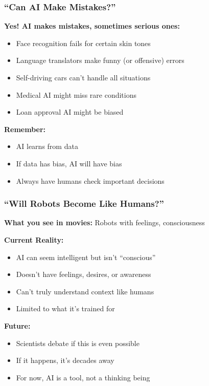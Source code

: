 \begin{frame}[fragile]\frametitle{``Can AI Make Mistakes?''}

{\bf Yes! AI makes mistakes, sometimes serious ones:}

\begin{itemize}
\item Face recognition fails for certain skin tones
\item Language translators make funny (or offensive) errors
\item Self-driving cars can't handle all situations
\item Medical AI might miss rare conditions
\item Loan approval AI might be biased
\end{itemize}

{\bf Remember:}
\begin{itemize}
\item AI learns from data
\item If data has bias, AI will have bias
\item Always have humans check important decisions
\end{itemize}
\end{frame}

\begin{frame}[fragile]\frametitle{``Will Robots Become Like Humans?''}

{\bf What you see in movies:} Robots with feelings, consciousness

{\bf Current Reality:}
\begin{itemize}
\item AI can seem intelligent but isn't ``conscious''
\item Doesn't have feelings, desires, or awareness
\item Can't truly understand context like humans
\item Limited to what it's trained for
\end{itemize}

{\bf Future:}
\begin{itemize}
\item Scientists debate if this is even possible
\item If it happens, it's decades away
\item For now, AI is a tool, not a thinking being
\end{itemize}
\end{frame}


